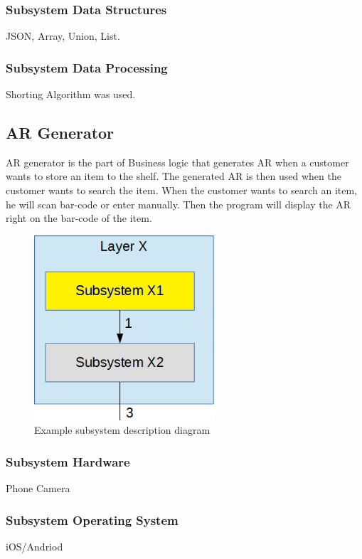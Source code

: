 \subsubsection{Subsystem Data Structures}
JSON, Array, Union, List.

\subsubsection{Subsystem Data Processing}
Shorting Algorithm was used.

\subsection{AR Generator}
AR generator is the part of Business logic that generates AR when a customer wants to store an item to the shelf. The generated AR is then used when the customer wants to search the item. When the customer wants to search an item, he will scan bar-code or enter manually. Then the program will display the AR right on the bar-code of the item.
\begin{figure}[h!]
	\centering
 	\includegraphics[width=0.60\textwidth]{images/subsystem}
 \caption{Example subsystem description diagram}
\end{figure}

\subsubsection{Subsystem Hardware}
Phone Camera

\subsubsection{Subsystem Operating System}
iOS/Andriod

